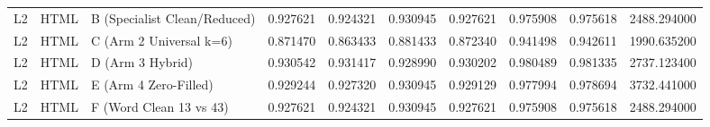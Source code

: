 \begin{tabular}{lllrrrrrrr}
L2 & HTML & B (Specialist Clean/Reduced) & 0.927621 & 0.924321 & 0.930945 & 0.927621 & 0.975908 & 0.975618 & 2488.294000 \\
L2 & HTML & C (Arm 2 Universal k=6) & 0.871470 & 0.863433 & 0.881433 & 0.872340 & 0.941498 & 0.942611 & 1990.635200 \\
L2 & HTML & D (Arm 3 Hybrid) & 0.930542 & 0.931417 & 0.928990 & 0.930202 & 0.980489 & 0.981335 & 2737.123400 \\
L2 & HTML & E (Arm 4 Zero-Filled) & 0.929244 & 0.927320 & 0.930945 & 0.929129 & 0.977994 & 0.978694 & 3732.441000 \\
L2 & HTML & F (Word Clean 13 vs 43) & 0.927621 & 0.924321 & 0.930945 & 0.927621 & 0.975908 & 0.975618 & 2488.294000 \\
\bottomrule
\end{tabular}

